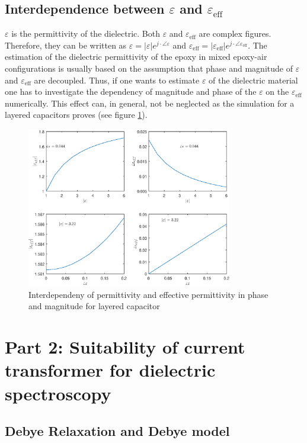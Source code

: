 \subsection{Interdependence between $\varepsilon$ and $\varepsilon_{\textrm{eff}}$} 
$\varepsilon$ is the permittivity of the dielectric. Both $\varepsilon$ and $\varepsilon_{\textrm{eff}}$ are complex figures. Therefore, they can be written as $\varepsilon = |\varepsilon| e^{j \cdot \angle \varepsilon} $ and $\varepsilon_{\textrm{eff}} = |\varepsilon_{\textrm{eff}}| e^{j \cdot \angle \varepsilon_{\textrm{eff}}} $.	
The estimation of the dielectric permittivity of the epoxy in mixed epoxy-air configurations is usually based on the assumption that phase and magnitude of $\varepsilon$ and $\varepsilon_{\textrm{eff}}$ are decoupled. Thus, if one wants to estimate $\varepsilon$ of the dielectric material one has to investigate the dependency of magnitude and phase of the $\varepsilon$ on the $\varepsilon_{\textrm{eff}}$ numerically. This effect can, in general, not be neglected as the simulation for a layered capacitors proves (see figure \ref{fig.layered}).  
\begin{figure}

	\includegraphics[width=0.8\textwidth]{figures/Theory/layereddielectrics.eps}
	\caption[Kurze Abbildungsbeschreibung]{Interdependeny of permittivity and effective permittivity in phase and magnitude for layered capacitor}
	\label{fig.layered}
\end{figure}
	
	
\section{Part 2: Suitability of current transformer for dielectric spectroscopy}
\subsection{Debye Relaxation and Debye model}


